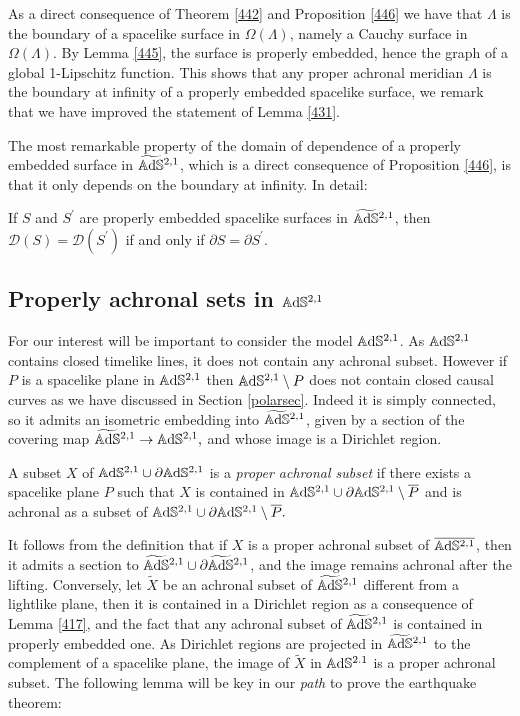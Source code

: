\begin{observation}\label{447}
    As a direct consequence of Theorem \ref{442} and Proposition \ref{446} we have that $\Lambda$ is the boundary of a spacelike surface in $\Omega(\Lambda)$, namely a Cauchy surface in $\Omega(\Lambda)$. By Lemma \ref{445}, the surface is properly embedded, hence the graph of a global 1-Lipschitz function. This shows that any proper achronal meridian $\Lambda$ is the boundary at infinity of a properly embedded spacelike surface, we remark that we have improved the statement of Lemma \ref{431}.
\end{observation}

The most remarkable property of the domain of dependence of a properly embedded surface in $\widetilde{\mathbb{A}\mathrm{d}\mathbb{S}}{}^{2,1}$, which is a direct consequence of Proposition \ref{446}, is that it only depends on the boundary at infinity. In detail:

\begin{corollary}\label{448}
    If $S$ and $S^{\prime}$ are properly embedded spacelike surfaces in $\widetilde{\mathbb{A}\mathrm{d}\mathbb{S}}{}^{2,1}$, then $\mathcal{D}(S)=\mathcal{D}(S^{\prime})$ if and only if $\partial S=\partial S^{\prime}$.
\end{corollary}

\subsection{Properly achronal sets in $\mathbb{A}\mathrm{d}\mathbb{S}^{2,1}$}
For our interest will be important to consider the model $\mathbb{A}\mathrm{d}\mathbb{S}^{2,1}$. As $\mathbb{A}\mathrm{d}\mathbb{S}^{2,1}$ contains closed timelike lines, it does not contain any achronal subset. However if $P$ is a spacelike plane in $\mathbb{A}\mathrm{d}\mathbb{S}^{2,1}$ then $\mathbb{A}\mathrm{d}\mathbb{S}^{2,1}\setminus P$ does not contain closed causal curves as we have discussed in Section \ref{polarsec}. Indeed it is simply connected, so it admits an isometric embedding into $\widetilde{\mathbb{A}\mathrm{d}\mathbb{S}}{}^{2,1}$, given by a section of the covering map $\widetilde{\mathbb{A}\mathrm{d}\mathbb{S}}{}^{2,1}\to\mathbb{A}\mathrm{d}\mathbb{S}^{2,1},$ and whose image is a Dirichlet region.
\begin{definition}
    A subset $X$ of $\mathbb{A}\mathrm{d}\mathbb{S}^{2,1}\cup\partial\mathbb{A}\mathrm{d}\mathbb{S}^{2,1}$ is a \textit{proper achronal subset} if there exists a spacelike plane $P$ such that $X$ is contained in $\mathbb{A}\mathrm{d}\mathbb{S}^{2,1}\cup\partial\mathbb{A}\mathrm{d}\mathbb{S}^{2,1}\setminus\overline{P}$ and is achronal as a subset of $\mathbb{A}\mathrm{d}\mathbb{S}^{2,1}\cup\partial\mathbb{A}\mathrm{d}\mathbb{S}^{2,1}\setminus\overline{P}.$  
\end{definition}

It follows from the definition that if $X$ is a proper achronal subset of $\overline{\mathbb{A}\mathrm{d}\mathbb{S}^{2,1}}$, then it admits a section to $\widetilde{\mathbb{A}\mathrm{d}\mathbb{S}}{}^{2,1}\cup\partial\widetilde{\mathbb{A}\mathrm{d}\mathbb{S}}{}^{2,1}$, and the image remains achronal after the lifting. Conversely, let $\widetilde{X}$ be an achronal subset of $\widetilde{\mathbb{A}\mathrm{d}\mathbb{S}}{}^{2,1}$ different from a lightlike plane, then it is contained in a Dirichlet region as a consequence of Lemma \ref{417}, and the fact that any achronal subset of $\widetilde{\mathbb{A}\mathrm{d}\mathbb{S}}{}^{2,1}$ is contained in properly embedded one. As Dirichlet regions are projected in $\widetilde{\mathbb{A}\mathrm{d}\mathbb{S}}{}^{2,1}$ to the complement of a spacelike plane, the image of $\widetilde{X}$ in $\mathbb{A}\mathrm{d}\mathbb{S}^{2.1}$ is a proper achronal subset. The following lemma will be key in our \textit{path} to prove the earthquake theorem:\\

